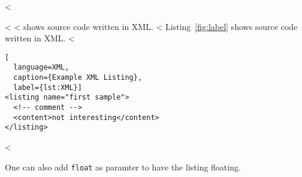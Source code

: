 <%

<%
<%
 shows source code written in XML.
<%
Listing~\ref{fig:label} shows source code written in XML.
<%

\begin{lstlisting}[
  language=XML,
  caption={Example XML Listing},
  label={lst:XML}]
<listing name="first sample">
  <!-- comment -->
  <content>not interesting</content>
</listing>
\end{lstlisting}
<%

One can also add \verb+float+ as paramter to have the listing floating.
